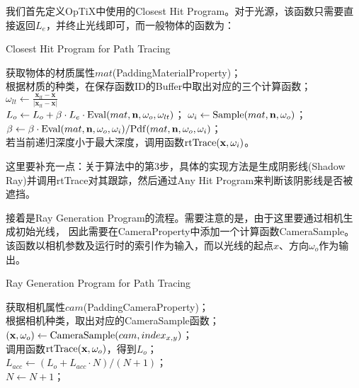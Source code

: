 我们首先定义OpTiX中使用的Closest Hit Program。对于光源，该函数只需要直接返回$L_e$，并终止光线即可，而一般物体的函数为：
\begin{algorithm}
    \caption{Closest Hit Program for Path Tracing}

    获取物体的材质属性$mat$(PaddingMaterialProperty)；\\
    根据材质的种类，在保存函数ID的Buffer中取出对应的三个计算函数；\\
    {
        $\omega_{lt} \leftarrow \frac{\textbf{x}_{lt}-\textbf{x}}{|\textbf{x}_{lt}-\textbf{x}|}$\\
        $L_o \leftarrow L_o+\beta\cdot L_e\cdot {\rm Eval}(mat, \textbf{n}, \omega_o, \omega_{lt}) $；
    }
    $\omega_i \leftarrow {\rm Sample}(mat, \textbf{n}, \omega_o)$；\\
    $\beta \leftarrow \beta\cdot {\rm Eval}(mat, \textbf{n}, \omega_o, \omega_i)/ {\rm Pdf}(mat, \textbf{n}, \omega_o, \omega_i)$；\\
    若当前递归深度小于最大深度，调用函数${\rm rtTrace}(\textbf{x}, \omega_i)$。   
\end{algorithm}

这里要补充一点：关于算法中的第3步，具体的实现方法是生成阴影线(Shadow Ray)并调用rtTrace对其跟踪，然后通过Any Hit Program来判断该阴影线是否被遮挡。

接着是Ray Generation Program的流程。需要注意的是，由于这里要通过相机生成初始光线，
因此需要在CameraProperty中添加一个计算函数CameraSample。
该函数以相机参数及运行时的索引作为输入，而以光线的起点$x$、方向$\omega_o$作为输出。

\begin{algorithm}
    \caption{Ray Generation Program for Path Tracing}

    获取相机属性$cam$(PaddingCameraProperty)；\\
    根据相机种类，取出对应的CameraSample函数；\\
    $(\textbf{x}, \omega_o) \leftarrow {\rm CameraSample}(cam, index_{x,y})$；\\
    调用函数${\rm rtTrace}(\textbf{x}, \omega_o)$，得到$L_o$；\\
    $L_{acc} \leftarrow (L_o+L_{acc}\cdot N)/(N+1)$；\\
    $N \leftarrow N+1$；
\end{algorithm}

